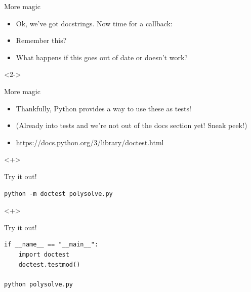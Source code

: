 \documentclass[usenames,dvipsnames]{beamer}
\begin{document}
\begin{frame}{More magic}
    \begin{itemize}[<+->]
        \item{}Ok, we've got docstrings. Now time for a callback:
        \item{}Remember this?
        \item{}What happens if this goes out of date or doesn't work?
    \end{itemize}

    \begin{onlyenv}<2->
        
    \end{onlyenv}
\end{frame}

\begin{frame}[fragile]{More magic}
    \begin{itemize}[<+->]
        \item{}Thankfully, Python provides a way to use these as tests!
        \item{}{\scriptsize (Already into tests and we're not out of the docs section yet! Sneak peek!)}
        \item{}\url{https://docs.python.org/3/library/doctest.html}
    \end{itemize}

    

    \begin{onlyenv}<+>
        \begin{block}{Try it out!}
            \begin{lstlisting}
python -m doctest polysolve.py
            \end{lstlisting}
        \end{block}
    \end{onlyenv}
        
    \begin{onlyenv}<+>
        \begin{block}{Try it out!}
            \begin{lstlisting}
if __name__ == "__main__":
    import doctest
    doctest.testmod()

python polysolve.py
            \end{lstlisting}
        \end{block}
    \end{onlyenv}
\end{frame}
\end{document}

